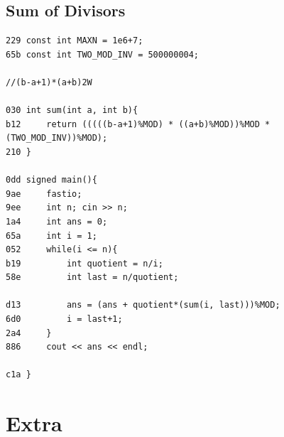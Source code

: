 \documentclass[11pt, a4paper, twoside]{article}
\begin{document}
\subsection{Sum of Divisors}
\begin{lstlisting}
229 const int MAXN = 1e6+7;
65b const int TWO_MOD_INV = 500000004;
 
//(b-a+1)*(a+b)2W
 
030 int sum(int a, int b){
b12     return (((((b-a+1)%MOD) * ((a+b)%MOD))%MOD * (TWO_MOD_INV))%MOD);
210 }
 
0dd signed main(){
9ae 	fastio;
9ee     int n; cin >> n;
1a4     int ans = 0;
65a     int i = 1;
052     while(i <= n){
b19         int quotient = n/i;
58e         int last = n/quotient;
     
d13         ans = (ans + quotient*(sum(i, last)))%MOD;
6d0         i = last+1;
2a4     }
886     cout << ans << endl;
     
c1a }
\end{lstlisting}

\pagebreak


%
%

\section{Extra}
\end{document}
